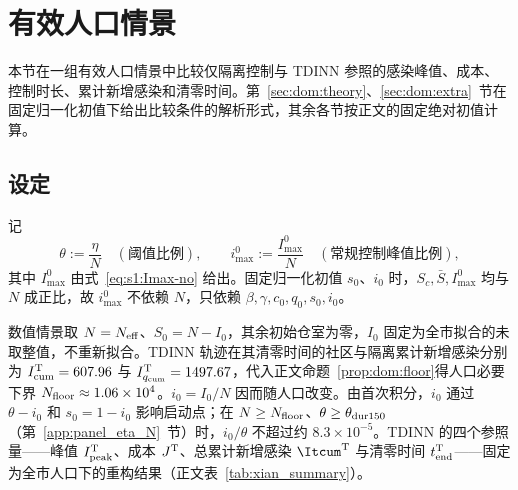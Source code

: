 \section{有效人口情景}
\label{sec:sup:population}
本节在一组有效人口情景中比较仅隔离控制与 TDINN 参照的感染峰值、成本、控制时长、累计新增感染和清零时间。第~\ref{sec:dom:theory}、\ref{sec:dom:extra}~节在固定归一化初值下给出比较条件的解析形式，其余各节按正文的固定绝对初值计算。

\subsection{设定}
\label{sec:dom:setup}
记
\begin{equation}
  \theta:=\frac{\eta}{N}\quad(\text{阈值比例}),\qquad
  i_{\max}^{0}:=\frac{I_{\max}^{0}}{N}\quad(\text{常规控制峰值比例}),
  \label{eq:dom:ratios}
\end{equation}
其中 $I_{\max}^{0}$ 由式~\eqref{eq:s1:Imax-no} 给出。固定归一化初值 $s_0$、$i_0$ 时，$S_c,\bar S,I_{\max}^{0}$ 均与 $N$ 成正比，故 $i_{\max}^{0}$ 不依赖 $N$，只依赖 $\beta,\gamma,c_0,q_0,s_0,i_0$。

数值情景取 $N=N_{\rm eff}$、$S_0=N-I_0$，其余初始仓室为零，$I_0$ 固定为全市拟合的未取整值，不重新拟合。TDINN 轨迹在其清零时间的社区与隔离累计新增感染分别为 $I^{\rm T}_{\rm cum}=607.96$ 与 $I^{\rm T}_{q_{\rm cum}}=1497.67$，代入正文命题~\ref{prop:dom:floor}得人口必要下界 $N_{\rm floor}\approx1.06\times10^4$。$i_0=I_0/N$ 因而随人口改变。由首次积分，$i_0$ 通过 $\theta-i_0$ 和 $s_0=1-i_0$ 影响启动点；在 $N\ge N_{\rm floor}$、$\theta\ge\theta_{\rm dur150}$（第~\ref{app:panel_eta_N}~节）时，$i_0/\theta$ 不超过约 $8.3\times10^{-5}$。TDINN 的四个参照量——峰值 $I^{\rm T}_{\rm peak}$、成本 $J^{\rm T}$、总累计新增感染 $\Itcum^{\rm T}$ 与清零时间 $t_{\rm end}^{\rm T}$——固定为全市人口下的重构结果（正文表~\ref{tab:xian_summary}）。

